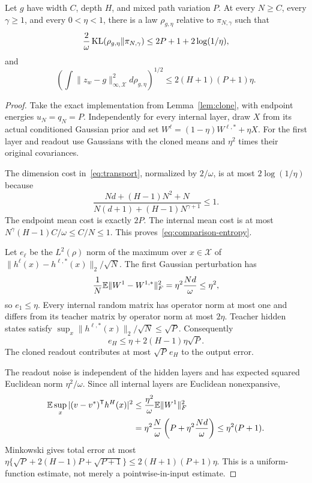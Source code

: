 \begin{lemma}
\label{lem:comparison}
Let $g$ have width $C$, depth $H$, and mixed path variation $P$. At every $N\ge C$, every $\gamma\ge1$, and every $0<\eta<1$, there is a law $\rho_{g,\eta}$ relative to $\pi_{N,\gamma}$ such that
\begin{equation}
 \frac2\omega\operatorname{KL}(\rho_{g,\eta}\|\pi_{N,\gamma})
 \le2P+1+2\log(1/\eta),
 \label{eq:comparison-entropy}
\end{equation}
and
\begin{equation}
 \left(\int\|z_w-g\|_{\infty,\mathcal X}^2d\rho_{g,\eta}\right)^{1/2}
 \le2(H+1)(P+1)\eta.
 \label{eq:comparison-uniform}
\end{equation}
\end{lemma}
\begin{proof}
Take the exact implementation from Lemma~\ref{lem:clone}, with endpoint energies $u_N=q_N=P$. Independently for every internal layer, draw $X$ from its actual conditioned Gaussian prior and set $W^\ell=(1-\eta)W^{\ell,*}+\eta X$. For the first layer and readout use Gaussians with the cloned means and $\eta^2$ times their original covariances.

The dimension cost in~\eqref{eq:transport}, normalized by $2/\omega$, is at most $2\log(1/\eta)$ because
\[
 \frac{Nd+(H-1)N^2+N}{N(d+1)+(H-1)N^{\gamma+1}}\le1.
\]
The endpoint mean cost is exactly $2P$. The internal mean cost is at most $N^\gamma(H-1)C/\omega\le C/N\le1$. This proves~\eqref{eq:comparison-entropy}.

Let $e_\ell$ be the $L^2(\rho)$ norm of the maximum over $x\in\mathcal X$ of $\|h^\ell(x)-h^{\ell,*}(x)\|_2/\sqrt N$. The first Gaussian perturbation has
\[
 \frac1N\mathbb E\|W^1-W^{1,*}\|_F^2
 =\eta^2\frac{Nd}{\omega}\le\eta^2,
\]
so $e_1\le\eta$. Every internal random matrix has operator norm at most one and differs from its teacher matrix by operator norm at most $2\eta$. Teacher hidden states satisfy $\sup_x\|h^{\ell,*}(x)\|_2/\sqrt N\le\sqrt P$. Consequently
\[
 e_H\le\eta+2(H-1)\eta\sqrt P.
\]
The cloned readout contributes at most $\sqrt P\,e_H$ to the output error.

The readout noise is independent of the hidden layers and has expected squared Euclidean norm $\eta^2/\omega$. Since all internal layers are Euclidean nonexpansive,
\begin{align*}
 \mathbb E\sup_x| (v-v^*)^{\mathsf T}h^H(x)|^2
 &\le\frac{\eta^2}{\omega}\mathbb E\|W^1\|_F^2\\
 &=\eta^2\frac N\omega\left(P+\eta^2\frac{Nd}\omega\right)
 \le\eta^2(P+1).
\end{align*}
Minkowski gives total error at most
$\eta\{\sqrt P+2(H-1)P+\sqrt{P+1}\}\le2(H+1)(P+1)\eta$.
This is a uniform-function estimate, not merely a pointwise-in-input estimate.
\end{proof}

